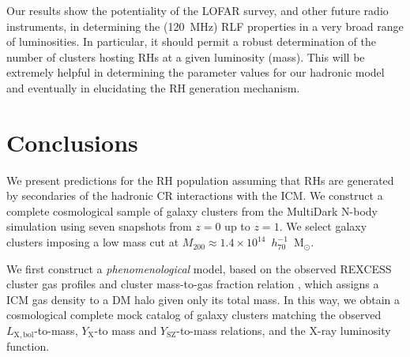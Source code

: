 \documentclass[traditabstract]{aa}
\newcommand{\rmn}{\mathrm}
\begin{document}
Our results show the potentiality of the LOFAR survey, and other future radio instruments, in determining the (120~MHz) RLF properties in a very broad range of luminosities. In particular, it should permit a robust determination of the number of clusters hosting RHs at a given luminosity (mass). This will be extremely helpful in determining the parameter values for our hadronic model and eventually in elucidating the RH generation mechanism.


\section{Conclusions}
\label{sec:6}
We present predictions for the RH population assuming that RHs are generated by secondaries of the hadronic CR interactions with the ICM. We construct a complete cosmological sample of galaxy clusters from the MultiDark N-body simulation \citep{2011arXiv1104.5130P} using seven snapshots from $z = 0$ up to $z = 1$. We select galaxy clusters imposing a low mass cut at $M_{200}\approx1.4\times10^{14}$~$h_{70}^{-1}$~M$_{\odot}$. 

We first construct a \emph{phenomenological} model, based on the observed REXCESS cluster gas profiles \citep{2008A&A...487..431C} and cluster mass-to-gas fraction relation \citep{2009ApJ...693.1142S}, which assigns a ICM gas density to a DM halo given only its total mass. In this way, we obtain a cosmological complete mock catalog of galaxy clusters matching the observed $L_{\rmn{X, bol}}$-to-mass, $Y_{\rmn{X}}$-to mass and $Y_{\rmn{SZ}}$-to-mass relations, and the X-ray luminosity function.
\end{document}
